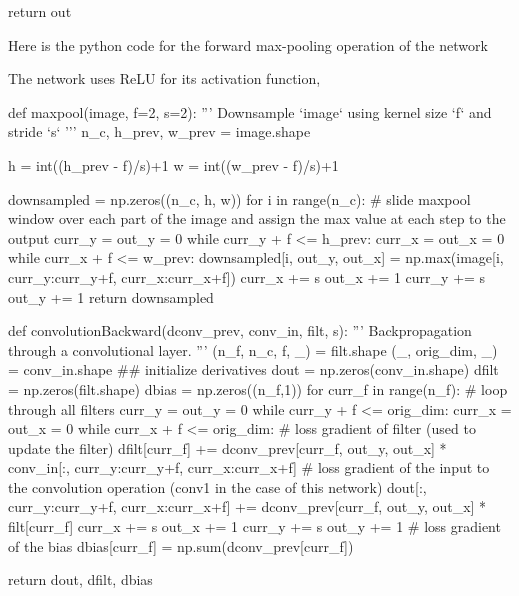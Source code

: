     return out
\stoptyping
\stopsubsection

\startsubsection[title=Max pooling]
Here is the python code for the forward max-pooling operation of the network
\stopsubsection

\startsubsection[title=Various functions]
The network uses ReLU for its activation function, 

\stopsubsection





\starttyping
def maxpool(image, f=2, s=2):
    '''
    Downsample `image` using kernel size `f` and stride `s`
    '''
    n_c, h_prev, w_prev = image.shape
    
    h = int((h_prev - f)/s)+1
    w = int((w_prev - f)/s)+1
    
    downsampled = np.zeros((n_c, h, w))
    for i in range(n_c):
        # slide maxpool window over each part of the image and assign the max value at each step to the output
        curr_y = out_y = 0
        while curr_y + f <= h_prev:
            curr_x = out_x = 0
            while curr_x + f <= w_prev:
                downsampled[i, out_y, out_x] = np.max(image[i, curr_y:curr_y+f, curr_x:curr_x+f])
                curr_x += s
                out_x += 1
            curr_y += s
            out_y += 1
    return downsampled
\stoptyping

\starttyping
def convolutionBackward(dconv_prev, conv_in, filt, s):
    '''
    Backpropagation through a convolutional layer. 
    '''
    (n_f, n_c, f, _) = filt.shape
    (_, orig_dim, _) = conv_in.shape
    ## initialize derivatives
    dout = np.zeros(conv_in.shape) 
    dfilt = np.zeros(filt.shape)
    dbias = np.zeros((n_f,1))
    for curr_f in range(n_f):
        # loop through all filters
        curr_y = out_y = 0
        while curr_y + f <= orig_dim:
            curr_x = out_x = 0
            while curr_x + f <= orig_dim:
                # loss gradient of filter (used to update the filter)
                dfilt[curr_f] += dconv_prev[curr_f, out_y, out_x] * conv_in[:, curr_y:curr_y+f, curr_x:curr_x+f]
                # loss gradient of the input to the convolution operation (conv1 in the case of this network)
                dout[:, curr_y:curr_y+f, curr_x:curr_x+f] += dconv_prev[curr_f, out_y, out_x] * filt[curr_f] 
                curr_x += s
                out_x += 1
            curr_y += s
            out_y += 1
        # loss gradient of the bias
        dbias[curr_f] = np.sum(dconv_prev[curr_f])
    
    return dout, dfilt, dbias
\stoptyping

